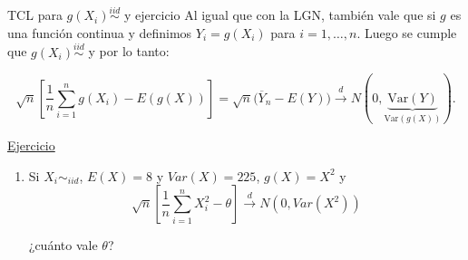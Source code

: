 \documentclass{beamer}
\theoremstyle{definition}
\begin{document}
\begin{frame}{\color{rosee}TCL para $g(X_i)\stackrel{iid}{\sim}$ y ejercicio}\small
Al igual que con la LGN, también vale que si $g$ es una función continua y definimos $Y_i = g(X_i)$ para $i=1,\dots,n$. Luego se cumple que $g(X_i)\stackrel{iid}{\sim}$ y por lo tanto:

$$\sqrt{n}\left[\dfrac{1}{n}\displaystyle\sum_{i=1}^{n} g(X_i) -E(g(X))\right] = \sqrt{n}\big(\overline{Y}_n -E(Y)\big) \overset{d}{\to} N(0,\underbrace{\text{Var}(Y)}_{\text{Var}(g(X))}).$$
    
    
    
    \underline{Ejercicio}
    
    \begin{enumerate}
       \item \noindent Si $X_i\sim_{iid}$, $E(X)=8$ y $Var(X)=225$, $g(X)=X^2$ y $$\sqrt{n}\left[\dfrac{1}{n}\displaystyle\sum_{i=1}^{n} X_i^2 -\theta \right]\overset{d}{\to} N(0,Var(X^2))$$
       
       ¿cuánto vale $\theta$?
       
        
        
        
        \end{enumerate}
\end{frame}

\end{document}
